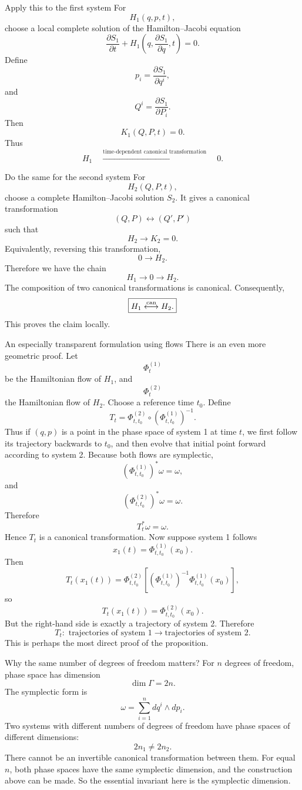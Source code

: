  Apply this to the first system
For
\[
H_1(q,p,t),
\]
choose a local complete solution of the Hamilton–Jacobi equation
\[
\frac{\partial S_1}{\partial t}
+
H_1\left(
q,\frac{\partial S_1}{\partial q},t
\right)=0.
\]
Define
\[
p_i=\frac{\partial S_1}{\partial q^i},
\]
and
\[
Q^i=\frac{\partial S_1}{\partial P_i}.
\]
Then
\[
K_1(Q,P,t)=0.
\]
Thus
\[
H_1
\quad\xrightarrow{\text{time-dependent canonical transformation}}\quad
0.
\]

 Do the same for the second system
For
\[
H_2(Q,P,t),
\]
choose a complete Hamilton–Jacobi solution \(S_2\). It gives a canonical transformation
\[
(Q,P)\longleftrightarrow (Q',P')
\]
such that
\[
H_2\longrightarrow K_2=0.
\]
Equivalently, reversing this transformation,
\[
0\longrightarrow H_2.
\]
Therefore we have the chain
\[
H_1
\longrightarrow
0
\longrightarrow
H_2.
\]
The composition of two canonical transformations is canonical.
Consequently,
\[
\boxed{
H_1
\stackrel{\rm can}{\longleftrightarrow}
H_2.
}
\]
This proves the claim locally.

An especially transparent formulation using flows
There is an even more geometric proof.
Let
\[
\Phi^{(1)}_t
\]
be the Hamiltonian flow of \(H_1\), and
\[
\Phi^{(2)}_t
\]
the Hamiltonian flow of \(H_2\).
Choose a reference time \(t_0\). Define
\[
\boxed{
T_t=
\Phi^{(2)}_{t,t_0}
\circ
\left(\Phi^{(1)}_{t,t_0}\right)^{-1}.
}
\]
Thus if \((q,p)\) is a point in the phase space of system 1 at time \(t\), we
first follow its trajectory backwards to \(t_0\), and then evolve that initial
point forward according to system 2.
Because both flows are symplectic,
\[
(\Phi^{(1)}_{t,t_0})^*\omega=\omega,
\]
and
\[
(\Phi^{(2)}_{t,t_0})^*\omega=\omega.
\]
Therefore
\[
\boxed{T_t^*\omega=\omega}.
\]
Hence \(T_t\) is a canonical transformation.
Now suppose system 1 follows
\[
x_1(t)=\Phi^{(1)}_{t,t_0}(x_0).
\]
Then
\[
T_t(x_1(t))
=
\Phi^{(2)}_{t,t_0}
\left[
(\Phi^{(1)}_{t,t_0})^{-1}
\Phi^{(1)}_{t,t_0}(x_0)
\right],
\]
so
\[
T_t(x_1(t))
=
\Phi^{(2)}_{t,t_0}(x_0).
\]
But the right-hand side is exactly a trajectory of system 2.
Therefore
\[
\boxed{
T_t:\text{ trajectories of system 1}
\longrightarrow
\text{trajectories of system 2}.
}
\]
This is perhaps the most direct proof of the proposition.

 Why the same number of degrees of freedom matters?
For \(n\) degrees of freedom, phase space has dimension
\[
\dim\Gamma=2n.
\]
The symplectic form is
\[
\omega=\sum_{i=1}^n dq^i\wedge dp_i.
\]
Two systems with different numbers of degrees of freedom have phase spaces of
different dimensions:
\[
2n_1\neq2n_2.
\]
There cannot be an invertible canonical transformation between them.
For equal \(n\), both phase spaces have the same symplectic dimension, and the
construction above can be made.
So the essential invariant here is the symplectic dimension.


